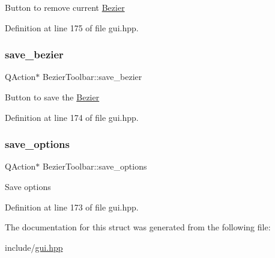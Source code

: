 Button to remove current \mbox{\hyperlink{classBezier}{Bezier}} 

Definition at line 175 of file gui.\+hpp.

\mbox{\label{structBezierToolbar_a2848e3a1e3d0eb3dfe63959c12538782}} 
\subsubsection{\texorpdfstring{save\+\_\+bezier}{save\_bezier}}
{\footnotesize\ttfamily Q\+Action$\ast$ Bezier\+Toolbar\+::save\+\_\+bezier}

Button to save the \mbox{\hyperlink{classBezier}{Bezier}} 

Definition at line 174 of file gui.\+hpp.

\mbox{\label{structBezierToolbar_a9d3e4ffe8c28b246dafd257110e28994}} 
\subsubsection{\texorpdfstring{save\+\_\+options}{save\_options}}
{\footnotesize\ttfamily Q\+Action$\ast$ Bezier\+Toolbar\+::save\+\_\+options}

Save options 

Definition at line 173 of file gui.\+hpp.



The documentation for this struct was generated from the following file\+:\begin{DoxyCompactItemize}
\item 
include/\mbox{\hyperlink{gui_8hpp}{gui.\+hpp}}\end{DoxyCompactItemize}
